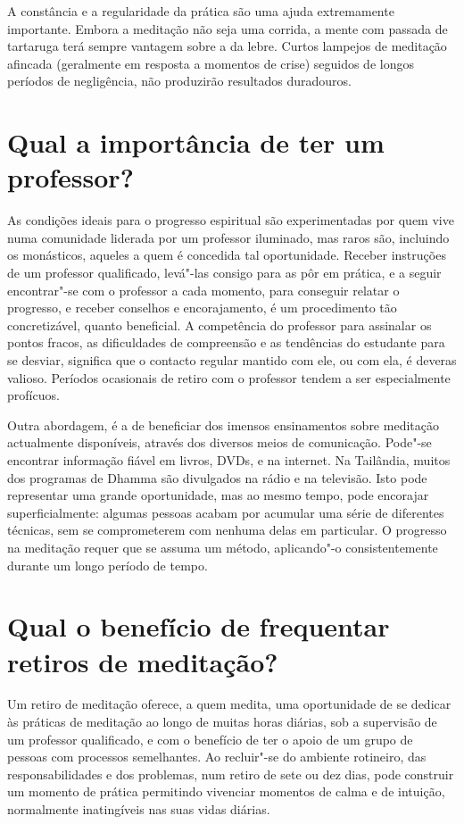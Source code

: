 A constância e a regularidade da prática são uma ajuda extremamente
importante. Embora a meditação não seja uma corrida, a mente com passada
de tartaruga terá sempre vantagem sobre a da lebre. Curtos lampejos de
meditação afincada (geralmente em resposta a momentos de crise) seguidos
de longos períodos de negligência, não produzirão resultados duradouros.

\section{Qual a importância de ter um professor?}

As condições ideais para o progresso espiritual são experimentadas por
quem vive numa comunidade liderada por um professor iluminado, mas raros
são, incluindo os monásticos, aqueles a quem é concedida tal
oportunidade. Receber instruções de um professor qualificado, levá"-las
consigo para as pôr em prática, e a seguir encontrar"-se com o professor
a cada momento, para conseguir relatar o progresso, e receber conselhos
e encorajamento, é um procedimento tão concretizável, quanto beneficial.
A competência do professor para assinalar os pontos fracos, as
dificuldades de compreensão e as tendências do estudante para se
desviar, significa que o contacto regular mantido com ele, ou com ela, é
deveras valioso. Períodos ocasionais de retiro com o professor tendem a
ser especialmente profícuos.

Outra abordagem, é a de beneficiar dos imensos ensinamentos sobre
meditação actualmente disponíveis, através dos diversos meios de
comunicação. Pode"-se encontrar informação fiável em livros, DVDs, e na
internet. Na Tailândia, muitos dos programas de Dhamma são divulgados na
rádio e na televisão. Isto pode representar uma grande oportunidade, mas
ao mesmo tempo, pode encorajar superficialmente: algumas pessoas acabam
por acumular uma série de diferentes técnicas, sem se comprometerem com
nenhuma delas em particular. O progresso na meditação requer que se
assuma um método, aplicando"-o consistentemente durante um longo período
de tempo.

\section{Qual o benefício de frequentar retiros de meditação?}

Um retiro de meditação oferece, a quem medita, uma oportunidade de se
dedicar às práticas de meditação ao longo de muitas horas diárias, sob a
supervisão de um professor qualificado, e com o benefício de ter o apoio
de um grupo de pessoas com processos semelhantes. Ao recluir"-se do
ambiente rotineiro, das responsabilidades e dos problemas, num retiro de
sete ou dez dias, pode construir um momento de prática permitindo
vivenciar momentos de calma e de intuição, normalmente inatingíveis nas
suas vidas diárias.

